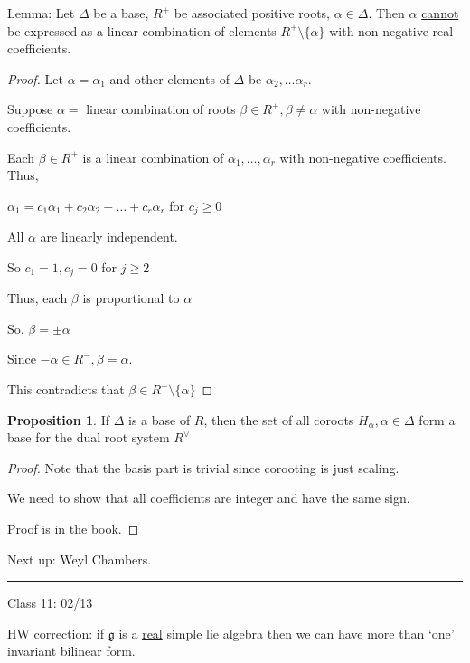 \documentclass{article}
\theoremstyle{definition}
\newtheorem{proposition}{Proposition}
\begin{document}
Lemma: Let \(\Delta \) be a base, \(R^+\) be associated positive roots, \(\alpha \in \Delta\). Then \(\alpha\) \underline{cannot} be expressed as a linear combination of elements \(R^+ \setminus \{ \alpha \} \) with non-negative real coefficients.

\begin{proof}
    Let \(\alpha =\alpha _1\) and other elements of \(\Delta \) be \(\alpha _2,\dots \alpha _r\).

    Suppose \(\alpha =\) linear combination of roots \(\beta \in R^+, \beta \neq \alpha\) with non-negative coefficients.

    Each \(\beta \in R^+\) is a linear combination of \(\alpha _1, \dots , \alpha _r\) with non-negative coefficients. Thus,

    \(\alpha _1 = c_1 \alpha _1 + c_2 \alpha _2 + \dots + c_r \alpha _r\) for \(c_j \geq 0\) 

    All \(\alpha\) are linearly independent.

    So \(c_1 = 1, c_j = 0\) for \(j \geq 2\) 

    Thus, each \(\beta\) is proportional to \(\alpha\) 

    So, \(\beta = \pm \alpha\) 

    Since \(-\alpha \in R^-,\beta = \alpha\).

    This contradicts that \(\beta \in R^+ \setminus \{ \alpha \} \)
\end{proof}

\begin{proposition}
    If \(\Delta\) is a base of \(R\), then the set of all coroots \(H_\alpha, \alpha \in \Delta\) form a base for the dual root system \(R^\vee\) 
\end{proposition}

\begin{proof}
    Note that the basis part is trivial since corooting is just scaling.

    We need to show that all coefficients are integer and have the same sign.

    Proof is in the book.
\end{proof}

Next up: Weyl Chambers.

\hfil
\hrule

Class 11: 02/13

HW correction: if \(\mathfrak{g}\) is a \underline{real} simple lie algebra then we can have more than `one' invariant bilinear form.
\end{document}
